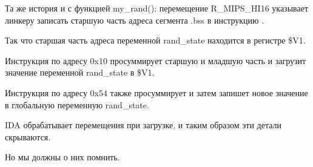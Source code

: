 Та же история и с функцией my\_rand(): перемещение R\_MIPS\_HI16 указывает линкеру записать старшую часть
адреса сегмента .bss в инструкцию \LUI.

Так что старшая часть адреса переменной rand\_state находится в регистре \$V1.

Инструкция \LW по адресу 0x10 просуммирует старшую и младшую часть и загрузит значение переменной 
rand\_state в \$V1.

Инструкция \SW по адресу 0x54 также просуммирует и затем запишет новое значение в глобальную переменную
rand\_state.

IDA обрабатывает перемещения при загрузке, и таким образом эти детали скрываются.

Но мы должны о них помнить.

